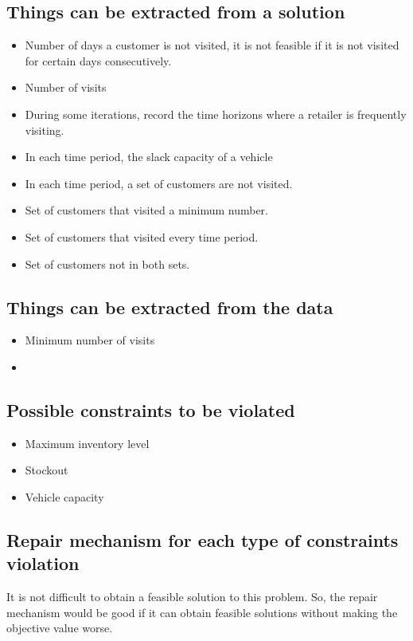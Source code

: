 \documentclass{article}
\begin{document}
\subsection{Things can be extracted from a solution}
\begin{itemize}
    \item Number of days a customer is not visited, it is not feasible if it is not visited for certain days consecutively.
    \item Number of visits 
    \item During some iterations, record the time horizons where a retailer is frequently visiting.
    \item In each time period, the slack capacity of a vehicle
    \item In each time period, a set of customers are not visited.
    \item Set of customers that visited a minimum number.
    \item Set of customers that visited every time period.
    \item Set of customers not in both sets.
    
    
\end{itemize}


\subsection{Things can be extracted from the data}
\begin{itemize}
    \item Minimum number of visits
    \item 
\end{itemize}

\subsection{Possible constraints to be violated}

\begin{itemize}
    \item Maximum inventory level
    \item Stockout
    \item Vehicle capacity
\end{itemize}
\subsection{Repair mechanism for each type of constraints violation}

It is not difficult to obtain a feasible solution to this problem. So, the repair mechanism would be good if it can obtain feasible solutions without making the objective value worse.
\end{document}
